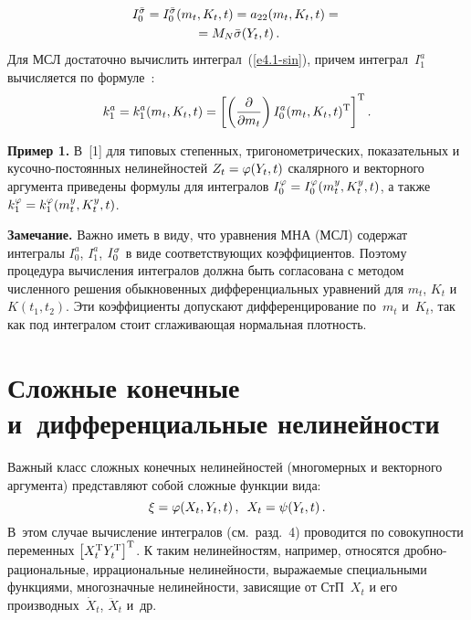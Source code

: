 \begin{multicols}{2}
\vspace*{-12pt}

\noindent
\begin{multline}
I_0^{\bar {\sigma}} = I_0^{\bar {\sigma}} (m_t, K_t, t) = a_{22}(m_t, K_t, t) ={}\\
{}= M_N \bar {\sigma} (Y_t, t)\,.\label{e4.3-sin}
\end{multline}
Для МСЛ достаточно вычислить интеграл~(\ref{e4.1-sin}),
причем интеграл~$I_1^a$ вычисляется по формуле~\cite{2-sin, 3-sin, 4-sin}:
\begin{equation*}
k_1^a = k_1^a (m_t, K_t, t)=\lk \left( \fr{\prt}{\prt m_t}\right)
I_0^a (m_t, K_t, t)^{\mathrm{T}}\rk^{\mathrm{T}}. %
\end{equation*}

\medskip

\noindent
\textbf{Пример 1.} В~[1] для типовых степенных, тригоно\-мет\-ри\-че\-ских,
показательных и ку\-соч\-но-по\-сто\-ян\-ных нелинейностей $Z_t \hm=\vrp (Y_t, t)$
скалярного и векторного аргумента приведены формулы для интегралов
$I_0^\vrp \hm= I_0^\vrp (m_t^y, K_t^y, t)$, а также
$k_1^\vrp \hm= k_1^\vrp (m_t^y, K_t^y, t)$.

\medskip

\noindent
\textbf{Замечание.}
 Важно иметь в виду, что уравнения МНА (МСЛ) содержат интегралы
 $I_0^a$, $I_1^a$, $I_0^\sigma$ в виде соответствующих коэффициентов.
 Поэтому процедура вычисления интегралов должна быть согласована с
 методом численного решения обыкновенных дифференциальных уравнений для
 $m_t$, $K_t$ и $K(t_1, t_2)$. Эти коэффициенты допускают дифференцирование
 по~$m_t$ и~$K_t$, так как под интегралом стоит сглаживающая нормальная плотность.

\section{Сложные конечные и~дифференциальные нелинейности}

Важный класс сложных конечных нелинейностей (многомерных и векторного аргумента)
представляют собой сложные функции вида:
    \begin{equation*}
    \xi =\vrp (X_t, Y_t, t)\,,\enskip X_t =\psi (Y_t, t)\,. %
    \end{equation*}
В~этом случае вычисление интегралов (см.\ разд.~4) проводится по совокупности
переменных  $\left[ X_t^{\mathrm{T}} Y_t^{\mathrm{T}}\right]^{\mathrm{T}}$.
К таким нелинейностям, например, относятся дроб\-но-ра\-ци\-о\-наль\-ные,
иррациональные  нелинейности, выражаемые специальными функциями, многозначные
нелинейности, зависящие от СтП~$X_t$ и его производных~$\dot X_t$,  $\ddot X_t$
и~др.


\end{multicols}
